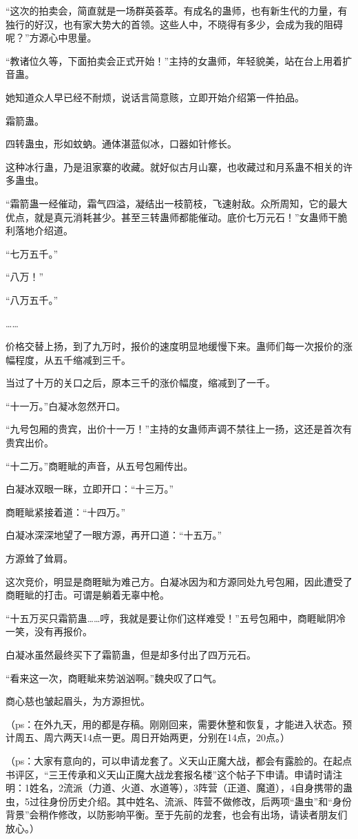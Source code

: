 \begin{this_body}
“这次的拍卖会，简直就是一场群英荟萃。有成名的蛊师，也有新生代的力量，有独行的好汉，也有家大势大的首领。这些人中，不晓得有多少，会成为我的阻碍呢？”方源心中思量。

“教诸位久等，下面拍卖会正式开始！”主持的女蛊师，年轻貌美，站在台上用着扩音蛊。

她知道众人早已经不耐烦，说话言简意赅，立即开始介绍第一件拍品。

霜箭蛊。

四转蛊虫，形如蚊蚋。通体湛蓝似冰，口器如针修长。

这种冰行蛊，乃是沮家寨的收藏。就好似古月山寨，也收藏过和月系蛊不相关的许多蛊虫。

“霜箭蛊一经催动，霜气四溢，凝结出一枝箭枝，飞速射敌。众所周知，它的最大优点，就是真元消耗甚少。甚至三转蛊师都能催动。底价七万元石！”女蛊师干脆利落地介绍道。

“七万五千。”

“八万！”

“八万五千。”

……

价格交替上扬，到了九万时，报价的速度明显地缓慢下来。蛊师们每一次报价的涨幅程度，从五千缩减到三千。

当过了十万的关口之后，原本三千的涨价幅度，缩减到了一千。

“十一万。”白凝冰忽然开口。

“九号包厢的贵宾，出价十一万！”主持的女蛊师声调不禁往上一扬，这还是首次有贵宾出价。

“十二万。”商睚眦的声音，从五号包厢传出。

白凝冰双眼一眯，立即开口：“十三万。”

商睚眦紧接着道：“十四万。”

白凝冰深深地望了一眼方源，再开口道：“十五万。”

方源耸了耸肩。

这次竞价，明显是商睚眦为难己方。白凝冰因为和方源同处九号包厢，因此遭受了商睚眦的打击。可谓是躺着无辜中枪。

“十五万买只霜箭蛊……哼，我就是要让你们这样难受！”五号包厢中，商睚眦阴冷一笑，没有再报价。

白凝冰虽然最终买下了霜箭蛊，但是却多付出了四万元石。

“看来这一次，商睚眦来势汹汹啊。”魏央叹了口气。

商心慈也皱起眉头，为方源担忧。

（ps：在外九天，用的都是存稿。刚刚回来，需要休整和恢复，才能进入状态。预计周五、周六两天14点一更。周日开始两更，分别在14点，20点。）

（ps：大家有意向的，可以申请龙套了。义天山正魔大战，都会有露脸的。在起点书评区，“三王传承和义天山正魔大战龙套报名楼”这个帖子下申请。申请时请注明：1姓名，2流派（力道、火道、水道等），3阵营（正道、魔道），4自身携带的蛊虫，5过往身份历史介绍。其中姓名、流派、阵营不做修改，后两项“蛊虫”和“身份背景”会稍作修改，以防影响平衡。至于先前的龙套，也会有出场，请读者朋友们放心。）

\end{this_body}

